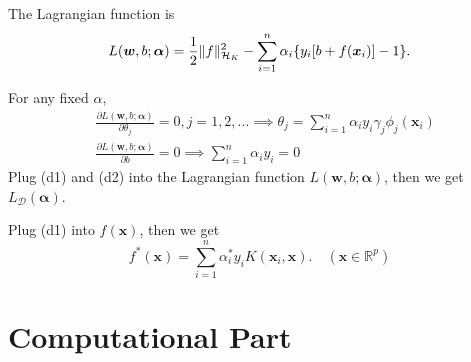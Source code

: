 \documentclass[10pt]{article}
\theoremstyle{definition}
\theoremstyle{remark}
\newcommand{\bw}{\bm{w}}
\newcommand{\bx}{\bm{x}}
\newcommand{\balpha}{\bm{\alpha}}
\newcommand{\bbR}{\mathbb{R}}
\newcommand{\cD}{\mathcal{D}}
\newcommand{\cH}{\mathcal{H}}
\begin{document}
\begin{enumerate}
\begin{itemize}
		The Lagrangian function is \[L(\bw,b;\balpha) = {1 \over 2}\|f\|_{\cH_{K}}^{2} - \sum_{i=1}^n \alpha_i \{y_{i}[b + f(\bx_{i})] - 1\}. \]
		
		For any fixed $\alpha$,
		\begin{align*}
		    & \frac{\partial L(\bw,b;\balpha)}{\partial \theta_j} = 0, j=1,2,... \implies \theta_j = \sum_{i=1}^{n} \alpha_i y_{i} \gamma_j \phi_{j}(\bx_i) \tag{d1} \\
		    & \frac{\partial L(\bw,b;\balpha)}{\partial b} = 0 \implies \sum_{i=1}^{n}\alpha_i y_i = 0 \tag{d2}
		\end{align*}
		Plug (d1) and (d2) into the Lagrangian function $L(\bw,b;\balpha)$, then we get $L_{\cD}(\balpha)$.
		
		Plug (d1) into $f(\bx)$, then we get 
		\[ f^{*}(\bx) = \sum_{i=1}^{n}\alpha_{i}^{*}y_{i}K(\bx_{i},\bx). \quad(\bx \in \bbR^{p}) \]
	\end{itemize}
	\end{enumerate}

\section*{Computational Part}
\end{document}
